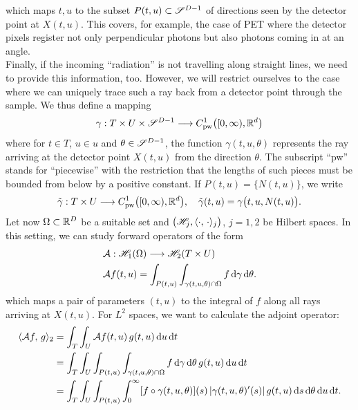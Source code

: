 \documentclass{amsart}
\begin{document}
%
which maps $t, u$ to the subset $P(t, u) \subset \mathscr{S}^{D-1}$ of directions seen by the detector point at $X(t, u)$. This covers, for 
example, the case of PET where the detector pixels register not only perpendicular photons but also photons coming in at an angle.\\[1ex]
%
%
Finally, if the incoming ``radiation'' is not travelling along straight lines, we need to provide this information, too. However, we will 
restrict ourselves to the case where we can uniquely trace such a ray back from a detector point through the sample. We thus define a 
mapping
%
\begin{equation}
 \label{eq:general:rays}
 \gamma: T \times U \times \mathscr{S}^{D-1} \longrightarrow C_{\mathrm{pw}}^1\big([0,\infty), {\mathbb{R}}^d\big)
\end{equation} 
%
where for $t \in T$, $u \in u$ and $\theta \in \mathscr{S}^{D-1}$, the function $\gamma(t, u, \theta)$ represents the ray arriving at the 
detector point $X(t, u)$ from the direction $\theta$. The subscript ``pw'' stands for ``piecewise'' with the restriction that the lengths 
of such pieces must be bounded from below by a positive constant.  If $P(t,u) = \lbrace N(t,u)\rbrace$, we write 
%
\begin{equation}
 \label{eq:general:ray_onedir}
 \tilde \gamma: T \times U \longrightarrow C_{\mathrm{pw}}^1\big([0,\infty), {\mathbb{R}}^d\big),\quad \tilde \gamma(t,u) = \gamma\big(t, u, N(t,u)\big).
\end{equation}
%
%
Let now $\Omega \subset {\ensuremath{\mathbb{R}}}^D$ be a suitable set and $\big({\mathscr{H}}_j, \langle \cdot,\,\cdot\rangle_j\big)$, $j=1,2$ be Hilbert spaces. In this 
setting, we can study forward operators of the form
%
\begin{align}
 & {\mathcal{A}}: {\mathscr{H}}_1(\Omega) \longrightarrow {\ensuremath{\mathscr{H}}}_2(T \times U) \notag \\
 \label{eq:general:fwdproj}
 & {\mathcal{A}} f(t, u) = \int_{P(t, u)} \int_{\gamma(t, u, \theta) \cap \Omega} f \, \mathrm{d} \gamma\, \mathrm{d} \theta.
\end{align}
%
which maps a pair of parameters $(t, u)$ to the integral of $f$ along all rays arriving at $X(t, u)$. For $L^2$ spaces, we want to 
calculate the adjoint operator:
%
\begin{align}
 \langle {\ensuremath{\mathcal{A}}} f,\,g\rangle_2 
 &= \int_T \int_U {\mathcal{A}} f(t, u)\, g(t, u)\, \mathrm{d} u\, \mathrm{d} t \notag \\
 &= \int_T \int_U \int_{P(t, u)} \int_{\gamma(t, u, \theta) \cap \Omega} f \, \mathrm{d} \gamma\, \mathrm{d} \theta\, g(t, u)\, \mathrm{d} u\, \mathrm{d} t \notag \\
 \label{eq:general:backproj_calculation_step1}
 &= \int_T \int_U \int_{P(t, u)} \int_0^\infty  [f \circ \gamma(t, u, \theta)](s)\, |\gamma(t, u, \theta)'(s)|\, g(t, u)\, \mathrm{d} s\, 
 \mathrm{d} \theta\, \mathrm{d} u\, \mathrm{d} t.
\end{align}
\end{document}
